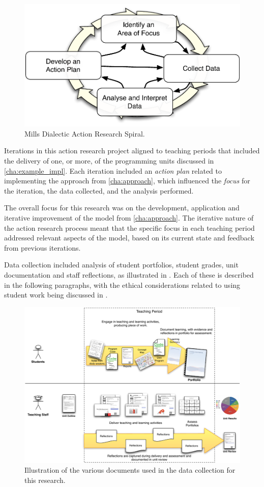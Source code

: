 \begin{figure}[htbp]
  \centering
  \includegraphics[width=0.7\columnwidth]{MillsSpiral}
  \caption{Mills \cite{Mills:2010} Dialectic Action Research Spiral.}
  \label{fig:mills_spiral}
\end{figure}

Iterations in this action research project aligned to teaching periods that included the delivery of one, or more, of the programming units discussed in \cref{cha:example_impl}. Each iteration included an \emph{action plan} related to implementing the approach from \cref{cha:approach}, which influenced the \emph{focus} for the iteration, the data collected, and the analysis performed.

The overall focus for this research was on the development, application and iterative improvement of the model from \cref{cha:approach}. The iterative nature of the action research process meant that the specific focus in each teaching period addressed relevant aspects of the model, based on its current state and feedback from previous iterations. 

Data collection included analysis of student portfolios, student grades, unit documentation and staff reflections, as illustrated in . Each of these is described in the following paragraphs, with the ethical considerations related to using student work being discussed in .

\begin{figure}[thb]
  \centering
  \includegraphics[width=\textwidth]{ResearchData}
  \caption{Illustration of the various documents used in the data collection for this research.}
  \label{fig:research_data}
\end{figure}

